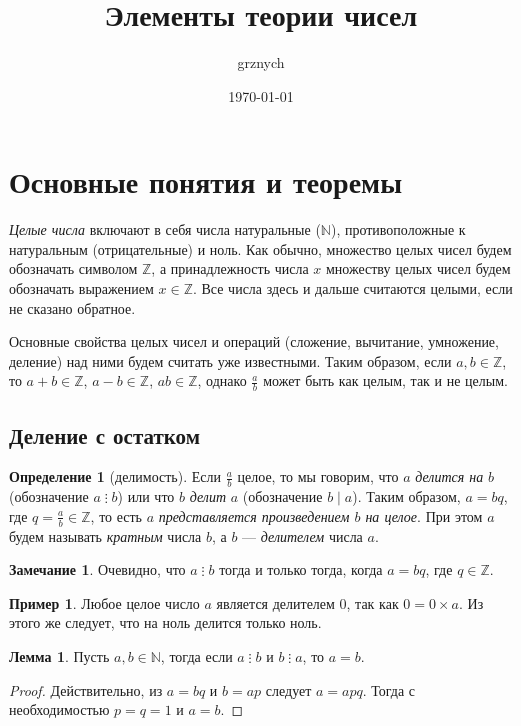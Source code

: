 \documentclass[14pt, a4paper]{extarticle}
\title{Элементы теории чисел}
\author{grznych}
\date{\today}
\theoremstyle{definition}
\newtheorem*{definition}{Определение}
\newtheorem{lemma}{Лемма}
\newtheorem*{remark}{Замечание}
\newtheorem{example}{Пример}
\newcommand{\divisible}{\mathop{\vdots}}
\begin{document}
	
\maketitle
\tableofcontents
	
\newpage
\section{Основные понятия и теоремы}
\label{section:osn}
	
	\emph{Целые числа} включают в себя числа натуральные ($\mathbb{N}$), противоположные к натуральным (отрицательные) и ноль. Как обычно, множество целых чисел будем обозначать символом $\mathbb{Z}$, а принадлежность числа $x$ множеству целых чисел будем обозначать выражением $x\in\mathbb{Z}$. Все числа здесь и дальше считаются целыми, если не сказано обратное.
	
	Основные свойства целых чисел и операций (сложение, вычитание, умножение, деление) над ними будем считать уже известными. Таким образом, если $a,b\in\mathbb{Z}$, то $a+b\in\mathbb{Z}$, $a-b\in\mathbb{Z}$, $ab\in\mathbb{Z}$, однако $\frac{a}{b}$ может быть как целым, так и не целым.
	
\subsection{Деление с остатком}
\label{subsection:del}
	
	\begin{definition}[делимость]
		Если $\frac{a}{b}$ целое, то мы говорим, что $a$ \emph{делится на} $b$ (обозначение $a\divisible b$) или что $b$ \emph{делит} $a$ (обозначение $b\mid a$). Таким образом, $a=bq$, где $q=\frac{a}{b}\in\mathbb{Z}$, то есть $a$ \emph{представляется произведением $b$ на целое}. При этом $a$ будем называть \emph{кратным} числа $b$, а $b$ --- \emph{делителем} числа $a$.
	\end{definition}

	\begin{remark}
		Очевидно, что $a\divisible b$ тогда и только тогда, когда $a=bq$, где $q\in\mathbb{Z}$.
	\end{remark}
	
	\begin{example}
		Любое целое число $a$ является делителем $0$, так как \mbox{$0=0\times a$}. Из этого же следует, что на ноль делится только ноль.
	\end{example}

	\begin{lemma}
	\label{rav}
		Пусть $a,b\in\mathbb{N}$, тогда если $a\divisible b$ и $b\divisible a$, то $a=b$.
	\end{lemma}
	\begin{proof}
		Действительно, из $a=bq$ и $b=ap$ следует $a=apq$. Тогда с необходимостью $p=q=1$ и $a=b$.
	\end{proof}
\end{document}
